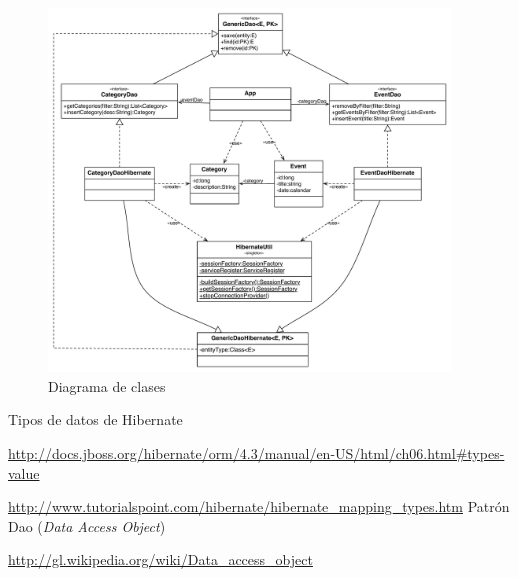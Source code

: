 \documentclass{article}
\begin{document}
\begin{figure}[h]
  \centering
    \includegraphics[width=0.95\textwidth]{commit05/img/UmlClass.pdf}
  \caption{Diagrama de clases}
  \label{fig:c05:UmlClass}
\end{figure}	

\clearpage
\newpage
{\setlength{\parskip}{0mm}\listoffigures}

\clearpage

\renewcommand{\bibname}{Referencias}
\begin{thebibliography}{99}
Tipos de datos de Hibernate

\url{http://docs.jboss.org/hibernate/orm/4.3/manual/en-US/html/ch06.html\#types-value}

\url{http://www.tutorialspoint.com/hibernate/hibernate\_mapping\_types.htm}
Patrón Dao (\textit{Data Access Object})

\url{http://gl.wikipedia.org/wiki/Data_access_object}
\end{thebibliography}
\end{document}
